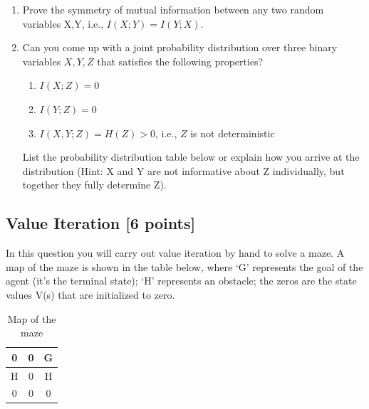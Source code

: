 \documentclass[11pt]{article}
\numberwithin{equation}{section} %
\numberwithin{figure}{section} %
\numberwithin{table}{section} %
\newcommand{\points}[1]{{\bf [#1 points]}}
\begin{document}
\begin{enumerate}
    
    \item[5] [2 points] Prove the symmetry of mutual information between any two random variables X,Y, i.e., $I(X;Y) = I(Y;X)$.\\
    \begin{tcolorbox}[fit,height=5cm, width=\linewidth, blank, borderline={1pt}{1pt}]
    \end{tcolorbox}
    
    
    \item[6] [bonus, 2 points] Can you come up with a joint probability distribution over three binary variables $X, Y, Z$ that satisfies the following properties?
    \begin{enumerate}
        \item $I(X;Z)=0$
        \item $I(Y;Z)=0$
        \item $I(X,Y;Z) = H(Z) > 0$, i.e., $Z$ is not deterministic
    \end{enumerate}
    List the probability distribution table below or explain how you arrive at the distribution (Hint: X and Y are not informative about Z individually, but together they fully determine Z).
    \begin{tcolorbox}[fit,height=3cm, width=\linewidth, blank, borderline={1pt}{1pt}]
    \end{tcolorbox}

\end{enumerate}



\clearpage
\subsection{Value Iteration \points{6}}

In this question you will carry out value iteration by hand to solve a maze. A map of the maze is shown in the table below, where `G' represents the goal of the agent (it's the terminal state); `H' represents an obstacle; the zeros are the state values V(s) that are initialized to zero.

\begin{table}[H]
\begin{center}
  \begin{tabular}{ | c | c | c | }
    \hline
    0 & 0 & G\\ \hline
    H & 0 & H \\ \hline
    0 & 0 & 0 \\ \hline
  \end{tabular}
 \caption{Map of the maze}
\end{center}
\end{table}
\end{document}
